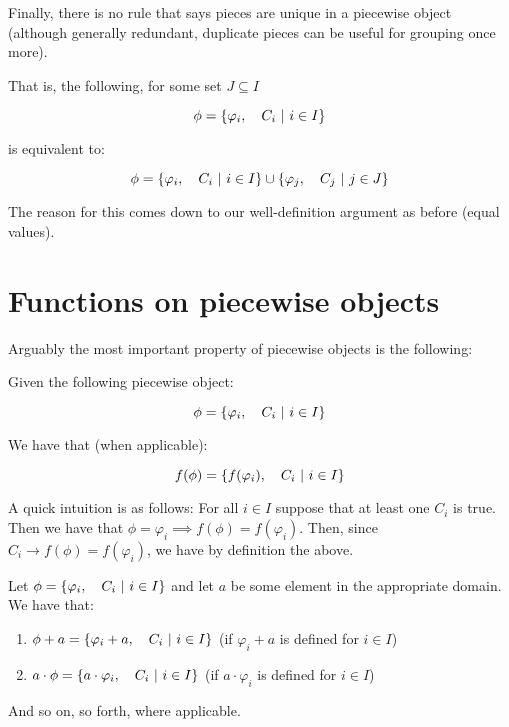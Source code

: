 \begin{theorem}
    Finally, there is no rule that says pieces are unique in a piecewise object (although generally redundant, duplicate pieces can be useful for grouping once more).

    That is, the following, for some set $J\subseteq I$

    $$
        \phi=\left\{\varphi_i,\quad C_i\ \middle|\ i\in I\right\}
    $$

    is equivalent to:

    $$
        \phi=\left\{\varphi_i,\quad C_i\ \middle|\ i\in I\right\}\cup\left\{\varphi_j,\quad C_j\ \middle|\ j\in J\right\}
    $$

    The reason for this comes down to our well-definition argument as before (equal values).
\end{theorem}
\section{Functions on piecewise objects}

Arguably the most important property of piecewise objects is the following:

\begin{theorem}
    Given the following piecewise object:

    $$
        \phi = \left\{\varphi_i,\quad C_i\ \middle|\ i\in I\right\}
    $$

    We have that (when applicable):

    $$
        f(\phi) = \left\{f(\varphi_i),\quad C_i\ \middle|\ i\in I\right\}
    $$

    A quick intuition is as follows: For all $i\in I$ suppose that at least one $C_i$ is true. Then we have that $\phi=\varphi_i\implies f(\phi)=f(\varphi_i)$. Then, since $C_i\rightarrow f(\phi)=f(\varphi_i)$, we have by definition the above.
\end{theorem}

\begin{theorem}
    Let $\phi=\left\{\varphi_i,\quad C_i\ \middle|\ i\in I\right\}$ and let $a$ be some element in the appropriate domain. We have that:

    \begin{enumerate}
        \item $\phi+a=\left\{\varphi_i+a,\quad C_i\ \middle|\ i\in I\right\}$ (if $\varphi_i+a$ is defined for $i\in I$)
        \item $a\cdot\phi=\left\{a\cdot\varphi_i,\quad C_i\ \middle|\ i\in I\right\}$ (if $a\cdot\varphi_i$ is defined for $i\in I$)
    \end{enumerate}

    And so on, so forth, where applicable.
\end{theorem}

